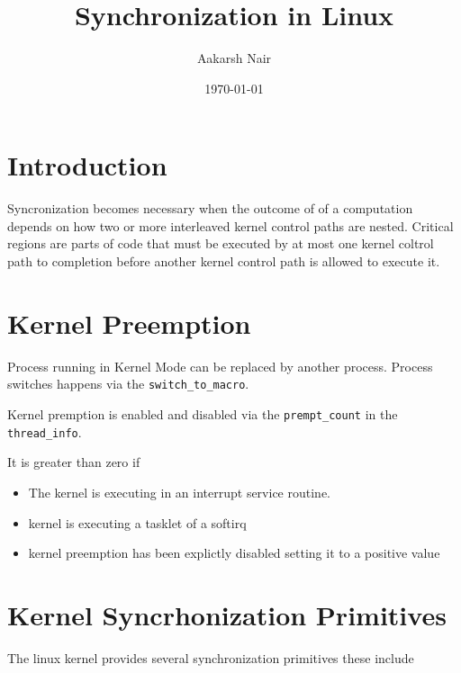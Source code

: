 \documentclass{article}
\title{Synchronization in Linux}
\author{Aakarsh Nair}
\date{\today}
\begin{document}
\lstset{language=C}  

\maketitle


\setcounter{tocdepth}{3}
\tableofcontents

\maketitle
\vspace*{1cm}

\section{Introduction}


Syncronization becomes necessary when the outcome of of a computation
depends on how two or more interleaved kernel control paths are
nested. Critical regions are parts of code that must be executed by at
most one kernel coltrol path to completion before another kernel
control path is allowed to execute it.

\section{Kernel Preemption}

Process running in Kernel Mode can be replaced by another
process. Process switches happens via the \lstinline{switch_to_macro}.

Kernel premption is enabled and disabled via the
\lstinline{prempt_count} in the \lstinline{thread_info}.

It is greater than zero if 

\begin{itemize}
\item The kernel is executing in an interrupt service routine.
\item kernel is executing a tasklet of a softirq
\item kernel preemption has been explictly disabled setting it to a
  positive value
\end{itemize}




\section{Kernel Syncrhonization Primitives}


The linux kernel provides several synchronization primitives these
include
\end{document}
